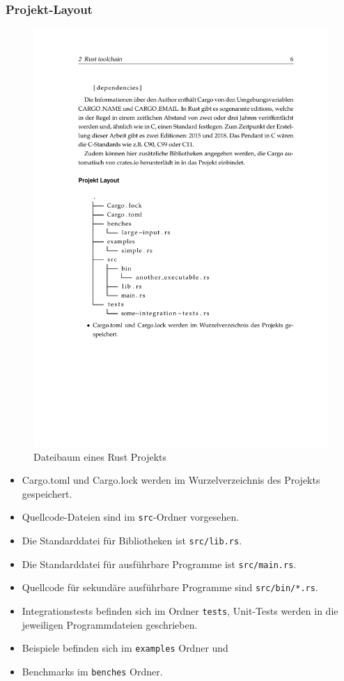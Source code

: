\subsubsection{Projekt-Layout}

\begin{figure}[htbp]
    \centering
    \includegraphics{Toolchain/dateibaum.pdf}
    \caption{Dateibaum eines Rust Projekts}
\end{figure}

\begin{itemize}
    \item Cargo.toml und Cargo.lock werden im Wurzelverzeichnis des Projekts gespeichert.
    \item Quellcode-Dateien sind im \verb"src"-Ordner vorgesehen.
    \item Die Standarddatei für Bibliotheken ist \verb"src/lib.rs".
    \item Die Standarddatei für ausführbare Programme ist \verb"src/main.rs".
    \item Quellcode für sekundäre ausführbare Programme sind \verb"src/bin/*.rs".
    \item Integrationstests befinden sich im Ordner \verb"tests", Unit-Tests werden in die jeweiligen Programmdateien geschrieben.
    \item Beispiele befinden sich im \verb"examples" Ordner und
    \item Benchmarks im \verb"benches" Ordner.
\end{itemize}

